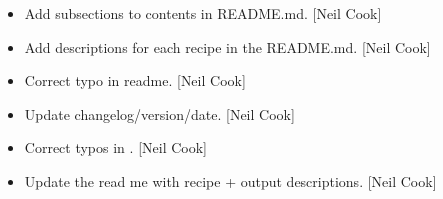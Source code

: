 \documentclass[a4paper,10pt,english]{report}
\begin{document}
\begin{itemize}
\item {} 
Add subsections to contents in README.md. {[}Neil Cook{]}

\item {} 
Add descriptions for each recipe in the README.md. {[}Neil Cook{]}

\item {} 
Correct typo in readme. {[}Neil Cook{]}

\item {} 
Update changelog/version/date. {[}Neil Cook{]}

\item {} 
Correct typos in . {[}Neil Cook{]}

\item {} 
Update the read me with recipe + output descriptions. {[}Neil Cook{]}

\end{itemize}
\end{document}
